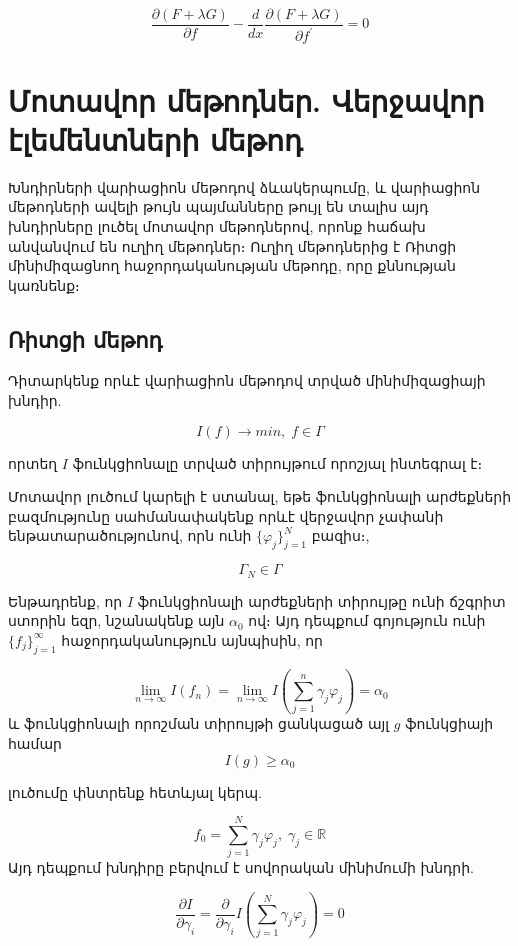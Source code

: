 \documentclass[fleqn, bachelor,subf,12pt,notitlepage]{disser}
\begin{document}
$$\dfrac{\partial \left(F+\lambda G\right)}{\partial f} - \dfrac{d}{dx} \dfrac{\partial \left(F+\lambda G\right)}{\partial f^{'}} = 0$$


\newpage


\section*{Մոտավոր մեթոդներ. Վերջավոր էլեմենտների մեթոդ}

Խնդիրների վարիացիոն մեթոդով ձևակերպումը, և վարիացիոն մեթոդների ավելի թույն պայմանները թույլ են տալիս այդ խնդիրները լուծել մոտավոր մեթոդներով, որոնք հաճախ անվանվում են ուղիղ մեթոդներ։ Ուղիղ մեթոդներից է Ռիտցի մինիմիզացնող հաջորդականության մեթոդը, որը քննության կառնենք։ 

\subsection*{Ռիտցի մեթոդ}

Դիտարկենք որևէ վարիացիոն մեթոդով տրված մինիմիզացիայի խնդիր.

		$$I\left(f\right) \longrightarrow min, \; f \in \Gamma$$

որտեղ $I$ ֆունկցիոնալը տրված տիրույթում որոշյալ ինտեգրալ է։

Մոտավոր լուծում կարելի է ստանալ, եթե ֆունկցիոնալի արժեքների բազմությունը սահմանափակենք որևէ վերջավոր չափանի ենթատարածությունով, որն ունի $\{\varphi_{j}\}_{j=1}^{N}$ բազիս։, 
			
			  $$\Gamma_{N} \in \Gamma $$

Ենթադրենք, որ $I$ ֆունկցիոնալի արժեքների տիրույթը ունի ճշգրիտ ստորին եզր, նշանակենք այն $\alpha_{0}$ ով։
Այդ դեպքում գոյություն ունի $\{f_{j}\}_{j=1}^{\infty}$ հաջորդականություն այնպիսին, որ

			$$ \lim_{n \to \infty}I\left(f_{n}\right) = \lim_{n \to \infty}I\left( \sum_{j=1}^{n} \gamma_{j}\varphi_{j} \right) = \alpha_{0}$$
և ֆունկցիոնալի որոշման տիրույթի ցանկացած այլ $g$ ֆունկցիայի համար
			$$I\left(g\right) \geq \alpha_{0}$$

լուծումը փնտրենք հետևյալ կերպ.

			$$f_{0}=\sum_{j=1}^{N}\gamma_{j}\varphi_{j}, \; \gamma_{j} \in \mathbb{R}$$
\noindent Այդ դեպքում խնդիրը բերվում է սովորական մինիմումի խնդրի.

   $$\dfrac{\partial I}{\partial \gamma_{i}} = \dfrac{\partial}{\partial \gamma_{i}} I \left(\sum_{j=1}^{N}\gamma_{j}\varphi_{j}\right) = 0 $$
\end{document}
